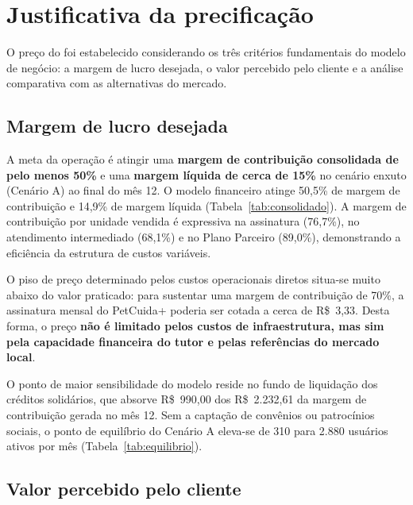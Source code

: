 \section{Justificativa da precificação}
\label{sec:justificativa}

O preço do \projeto{} foi estabelecido considerando os três critérios fundamentais do modelo de negócio: a margem de lucro desejada, o valor percebido pelo cliente e a análise comparativa com as alternativas do mercado.

\subsection{Margem de lucro desejada}

A meta da operação é atingir uma \textbf{margem de contribuição consolidada de pelo menos 50\%} e uma \textbf{margem líquida de cerca de 15\%} no cenário enxuto (Cenário A) ao final do mês 12. O modelo financeiro atinge 50,5\% de margem de contribuição e 14,9\% de margem líquida (Tabela~\ref{tab:consolidado}). A margem de contribuição por unidade vendida é expressiva na assinatura (76,7\%), no atendimento intermediado (68,1\%) e no Plano Parceiro (89,0\%), demonstrando a eficiência da estrutura de custos variáveis.

O piso de preço determinado pelos custos operacionais diretos situa-se muito abaixo do valor praticado: para sustentar uma margem de contribuição de 70\%, a assinatura mensal do PetCuida+ poderia ser cotada a cerca de R\$~3,33. Desta forma, o preço \textbf{não é limitado pelos custos de infraestrutura, mas sim pela capacidade financeira do tutor e pelas referências do mercado local}.

O ponto de maior sensibilidade do modelo reside no fundo de liquidação dos créditos solidários, que absorve R\$~990,00 dos R\$~2.232,61 da margem de contribuição gerada no mês 12. Sem a captação de convênios ou patrocínios sociais, o ponto de equilíbrio do Cenário A eleva-se de 310 para 2.880 usuários ativos por mês (Tabela~\ref{tab:equilibrio}).

\subsection{Valor percebido pelo cliente}

